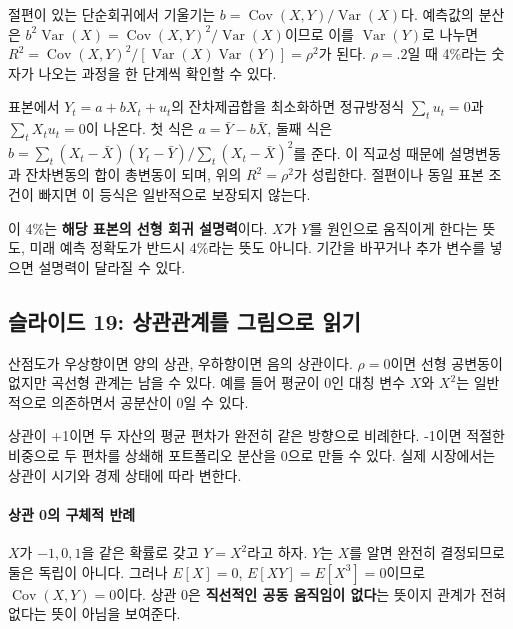 \documentclass[11pt,a4paper]{article}
\begin{document}
절편이 있는 단순회귀에서 기울기는 $b=\operatorname{Cov}(X,Y)/\operatorname{Var}(X)$다. 예측값의 분산은 $b^2\operatorname{Var}(X)=\operatorname{Cov}(X,Y)^2/\operatorname{Var}(X)$이므로 이를 $\operatorname{Var}(Y)$로 나누면 $R^2=\operatorname{Cov}(X,Y)^2/[\operatorname{Var}(X)\operatorname{Var}(Y)]=\rho^2$가 된다. $\rho=.2$일 때 4\%라는 숫자가 나오는 과정을 한 단계씩 확인할 수 있다.
\par

표본에서 $Y_t=a+bX_t+u_t$의 잔차제곱합을 최소화하면 정규방정식 $\sum_tu_t=0$과 $\sum_tX_tu_t=0$이 나온다. 첫 식은 $a=\bar Y-b\bar X$, 둘째 식은 $b=\sum_t(X_t-\bar X)(Y_t-\bar Y)/\sum_t(X_t-\bar X)^2$를 준다. 이 직교성 때문에 설명변동과 잔차변동의 합이 총변동이 되며, 위의 $R^2=\rho^2$가 성립한다. 절편이나 동일 표본 조건이 빠지면 이 등식은 일반적으로 보장되지 않는다.
\par

이 4\%는 \textbf{해당 표본의 선형 회귀 설명력}이다. $X$가 $Y$를 원인으로 움직이게 한다는 뜻도, 미래 예측 정확도가 반드시 4\%라는 뜻도 아니다. 기간을 바꾸거나 추가 변수를 넣으면 설명력이 달라질 수 있다.
\par

\subsection{슬라이드 19: 상관관계를 그림으로 읽기}

산점도가 우상향이면 양의 상관, 우하향이면 음의 상관이다. $\rho=0$이면 선형 공변동이 없지만 곡선형 관계는 남을 수 있다. 예를 들어 평균이 0인 대칭 변수 $X$와 $X^2$는 일반적으로 의존하면서 공분산이 0일 수 있다.
\par

상관이 +1이면 두 자산의 평균 편차가 완전히 같은 방향으로 비례한다. -1이면 적절한 비중으로 두 편차를 상쇄해 포트폴리오 분산을 0으로 만들 수 있다. 실제 시장에서는 상관이 시기와 경제 상태에 따라 변한다.
\par

\paragraph{상관 0의 구체적 반례}

$X$가 $-1,0,1$을 같은 확률로 갖고 $Y=X^2$라고 하자. $Y$는 $X$를 알면 완전히 결정되므로 둘은 독립이 아니다. 그러나 $E[X]=0$, $E[XY]=E[X^3]=0$이므로 $\operatorname{Cov}(X,Y)=0$이다. 상관 0은 \textbf{직선적인 공동 움직임이 없다}는 뜻이지 관계가 전혀 없다는 뜻이 아님을 보여준다.
\par
\end{document}
